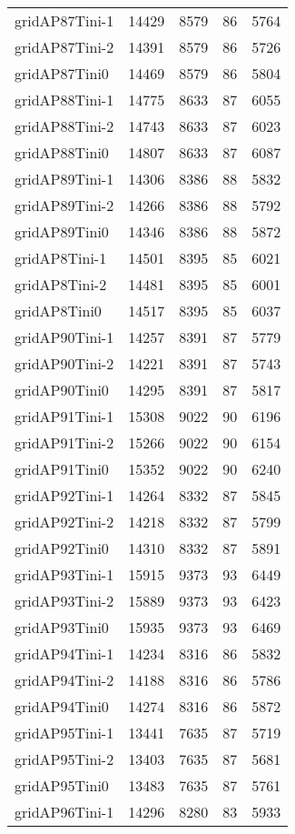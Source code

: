 \begin{longtable}{lrrrr}
gridAP87Tini-1 & 14429 & 8579 & 86 & 5764 \\
gridAP87Tini-2 & 14391 & 8579 & 86 & 5726 \\
gridAP87Tini0 & 14469 & 8579 & 86 & 5804 \\
gridAP88Tini-1 & 14775 & 8633 & 87 & 6055 \\
gridAP88Tini-2 & 14743 & 8633 & 87 & 6023 \\
gridAP88Tini0 & 14807 & 8633 & 87 & 6087 \\
gridAP89Tini-1 & 14306 & 8386 & 88 & 5832 \\
gridAP89Tini-2 & 14266 & 8386 & 88 & 5792 \\
gridAP89Tini0 & 14346 & 8386 & 88 & 5872 \\
gridAP8Tini-1 & 14501 & 8395 & 85 & 6021 \\
gridAP8Tini-2 & 14481 & 8395 & 85 & 6001 \\
gridAP8Tini0 & 14517 & 8395 & 85 & 6037 \\
gridAP90Tini-1 & 14257 & 8391 & 87 & 5779 \\
gridAP90Tini-2 & 14221 & 8391 & 87 & 5743 \\
gridAP90Tini0 & 14295 & 8391 & 87 & 5817 \\
gridAP91Tini-1 & 15308 & 9022 & 90 & 6196 \\
gridAP91Tini-2 & 15266 & 9022 & 90 & 6154 \\
gridAP91Tini0 & 15352 & 9022 & 90 & 6240 \\
gridAP92Tini-1 & 14264 & 8332 & 87 & 5845 \\
gridAP92Tini-2 & 14218 & 8332 & 87 & 5799 \\
gridAP92Tini0 & 14310 & 8332 & 87 & 5891 \\
gridAP93Tini-1 & 15915 & 9373 & 93 & 6449 \\
gridAP93Tini-2 & 15889 & 9373 & 93 & 6423 \\
gridAP93Tini0 & 15935 & 9373 & 93 & 6469 \\
gridAP94Tini-1 & 14234 & 8316 & 86 & 5832 \\
gridAP94Tini-2 & 14188 & 8316 & 86 & 5786 \\
gridAP94Tini0 & 14274 & 8316 & 86 & 5872 \\
gridAP95Tini-1 & 13441 & 7635 & 87 & 5719 \\
gridAP95Tini-2 & 13403 & 7635 & 87 & 5681 \\
gridAP95Tini0 & 13483 & 7635 & 87 & 5761 \\
gridAP96Tini-1 & 14296 & 8280 & 83 & 5933 \\

\end{longtable}
